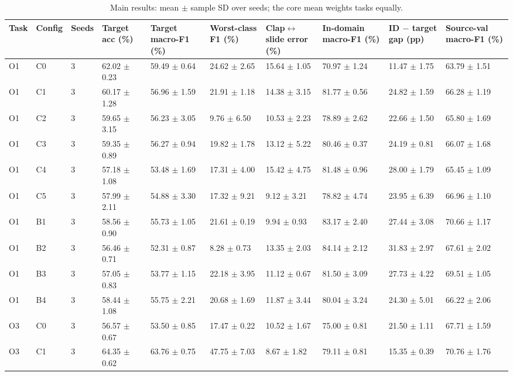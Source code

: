 \begin{table}[t]
\centering
\small
\caption{Main results: mean $\pm$ sample SD over seeds; the core mean weights tasks equally.}
\label{tab:T2_main_results}
\begin{tabular}{llllllllll}
\hline
Task & Config & Seeds & Target acc (\%) & Target macro-F1 (\%) & Worst-class F1 (\%) & Clap$\leftrightarrow$slide error (\%) & In-domain macro-F1 (\%) & ID $-$ target gap (pp) & Source-val macro-F1 (\%) \\
\hline
O1 & C0 & 3 & 62.02 $\pm$ 0.23 & 59.49 $\pm$ 0.64 & 24.62 $\pm$ 2.65 & 15.64 $\pm$ 1.05 & 70.97 $\pm$ 1.24 & 11.47 $\pm$ 1.75 & 63.79 $\pm$ 1.51 \\
O1 & C1 & 3 & 60.17 $\pm$ 1.28 & 56.96 $\pm$ 1.59 & 21.91 $\pm$ 1.18 & 14.38 $\pm$ 3.15 & 81.77 $\pm$ 0.56 & 24.82 $\pm$ 1.59 & 66.28 $\pm$ 1.19 \\
O1 & C2 & 3 & 59.65 $\pm$ 3.15 & 56.23 $\pm$ 3.05 & 9.76 $\pm$ 6.50 & 10.53 $\pm$ 2.23 & 78.89 $\pm$ 2.62 & 22.66 $\pm$ 1.50 & 65.80 $\pm$ 1.69 \\
O1 & C3 & 3 & 59.35 $\pm$ 0.89 & 56.27 $\pm$ 0.94 & 19.82 $\pm$ 1.78 & 13.12 $\pm$ 5.22 & 80.46 $\pm$ 0.37 & 24.19 $\pm$ 0.81 & 66.07 $\pm$ 1.68 \\
O1 & C4 & 3 & 57.18 $\pm$ 1.08 & 53.48 $\pm$ 1.69 & 17.31 $\pm$ 4.00 & 15.42 $\pm$ 4.75 & 81.48 $\pm$ 0.96 & 28.00 $\pm$ 1.79 & 65.45 $\pm$ 1.09 \\
O1 & C5 & 3 & 57.99 $\pm$ 2.11 & 54.88 $\pm$ 3.30 & 17.32 $\pm$ 9.21 & 9.12 $\pm$ 3.21 & 78.82 $\pm$ 4.74 & 23.95 $\pm$ 6.39 & 66.96 $\pm$ 1.10 \\
O1 & B1 & 3 & 58.56 $\pm$ 0.90 & 55.73 $\pm$ 1.05 & 21.61 $\pm$ 0.19 & 9.94 $\pm$ 0.93 & 83.17 $\pm$ 2.40 & 27.44 $\pm$ 3.08 & 70.66 $\pm$ 1.17 \\
O1 & B2 & 3 & 56.46 $\pm$ 0.71 & 52.31 $\pm$ 0.87 & 8.28 $\pm$ 0.73 & 13.35 $\pm$ 2.03 & 84.14 $\pm$ 2.12 & 31.83 $\pm$ 2.97 & 67.61 $\pm$ 2.02 \\
O1 & B3 & 3 & 57.05 $\pm$ 0.83 & 53.77 $\pm$ 1.15 & 22.18 $\pm$ 3.95 & 11.12 $\pm$ 0.67 & 81.50 $\pm$ 3.09 & 27.73 $\pm$ 4.22 & 69.51 $\pm$ 1.05 \\
O1 & B4 & 3 & 58.44 $\pm$ 1.08 & 55.75 $\pm$ 2.21 & 20.68 $\pm$ 1.69 & 11.87 $\pm$ 3.44 & 80.04 $\pm$ 3.24 & 24.30 $\pm$ 5.01 & 66.22 $\pm$ 2.06 \\
O3 & C0 & 3 & 56.57 $\pm$ 0.67 & 53.50 $\pm$ 0.85 & 17.47 $\pm$ 0.22 & 10.52 $\pm$ 1.67 & 75.00 $\pm$ 0.81 & 21.50 $\pm$ 1.11 & 67.71 $\pm$ 1.59 \\
O3 & C1 & 3 & 64.35 $\pm$ 0.62 & 63.76 $\pm$ 0.75 & 47.75 $\pm$ 7.03 & 8.67 $\pm$ 1.82 & 79.11 $\pm$ 0.81 & 15.35 $\pm$ 0.39 & 70.76 $\pm$ 1.76 \\

\end{tabular}
\end{table}
